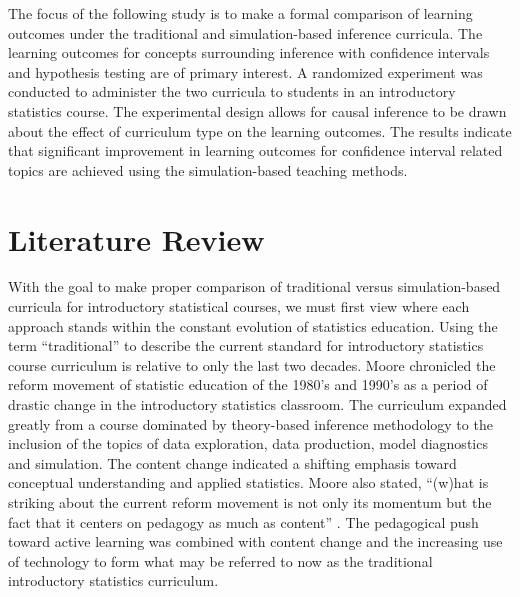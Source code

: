 The focus of the following study is to make a formal comparison of learning outcomes under the traditional and simulation-based inference curricula.  The learning outcomes for concepts surrounding inference with confidence intervals and hypothesis testing are of primary interest.  A randomized experiment was conducted to administer the two curricula to students in an introductory statistics course. The experimental design allows for causal inference to be drawn about the effect of curriculum type on the learning outcomes. The results indicate that significant improvement in learning outcomes for confidence interval related topics are achieved using the simulation-based teaching methods.
\section{Literature Review}
\label{litreview}

With the goal to make proper comparison of traditional versus simulation-based curricula for introductory statistical courses, we must first view where each approach stands within the constant evolution of statistics education. Using the term ``traditional'' to describe the current standard for introductory statistics course curriculum is relative to only the last two decades. Moore chronicled the reform movement of statistic education of the 1980's and 1990's as a period of drastic change in the introductory statistics classroom.  The curriculum expanded greatly from a course dominated by theory-based inference methodology to the inclusion of the topics of data exploration, data production, model diagnostics and simulation.  The content change indicated a shifting emphasis toward conceptual understanding and applied statistics.  Moore also stated, ``(w)hat is striking about the current reform movement is not only its momentum but the fact that it centers on pedagogy as much as content'' \citep{Moore1997}. The pedagogical push toward active learning was combined with content change and the increasing use of technology to form what may be referred to now as the traditional introductory statistics curriculum. 


